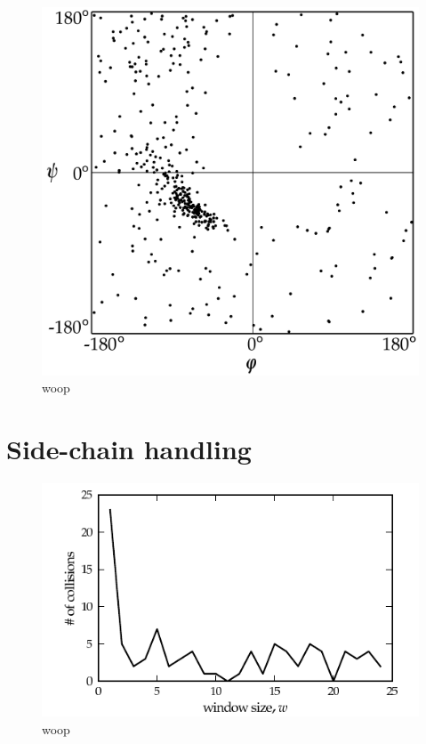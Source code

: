 \begin{figure}
	\centering
	\includegraphics[width=0.85\columnwidth]{figures/plot_ramachandran}
	\caption{woop}
\end{figure}


\section{Side-chain handling}
\label{sec:evaluation_handling_side-chains}
\begin{figure}
	\centering
	\hspace*{-3.5mm}\includegraphics[width=1.1\columnwidth]{figures/plot_collisions}
	\caption{woop}
\end{figure}




